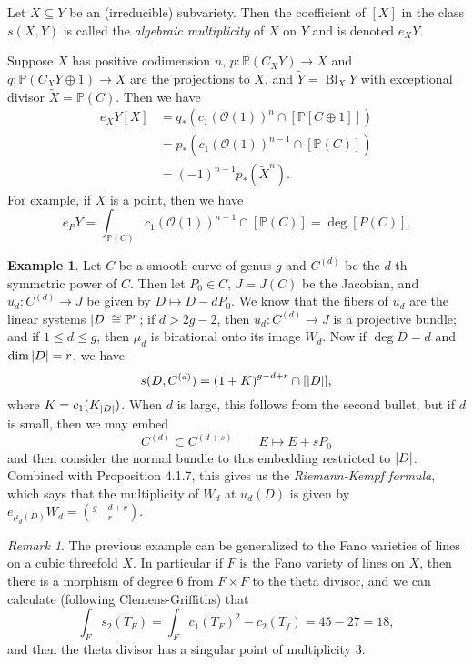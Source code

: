 \documentclass[leqno, openany]{memoir}
\theoremstyle{definition}
\newtheorem{exm}[thm]{Example}
\theoremstyle{remark}
\newtheorem{rmk}[thm]{Remark}
\theoremstyle{plain}
\theoremstyle{definition}
\theoremstyle{remark}
\renewcommand{\P}{\mathbb{P}}
\newcommand{\mc}[1]{\mathcal{#1}}
\newcommand{\wt}[1]{\widetilde{#1}}
\begin{document}
Let $X \subseteq Y$ be an (irreducible) subvariety. Then the coefficient of
$[X]$ in the class $s(X,Y)$ is called the \textit{algebraic multiplicity} of
$X$ on $Y$ and is denoted $e_X Y$. 

Suppose $X$ has positive codimension $n$, $p \colon \P(C_X Y) \to X$ and $q
\colon \P(C_X Y \oplus 1) \to X$ are the projections to $X$, and $\wt{Y} =
\operatorname{Bl}_X Y$ with exceptional divisor $\wt{X} = \P(C)$. Then we have
\begin{align*} e_X Y [X] &= q_* ( {c_1 ( \mc{O}(1) )}^n \cap [\P[C \oplus 1]] )
\\ &= p_* ({c_1 (\mc{O}(1))}^{n-1} \cap [\P(C)]) \\ &= {(-1)}^{n-1} p_*
(\wt{X}^n).  \end{align*} For example, if $X$ is a point, then we have \[ e_P Y
= \int_{\P(C)} {c_1(\mc{O}(1))}^{n-1} \cap [\P(C)] = \deg [P(C)]. \]

\begin{exm} Let $C$ be a smooth curve of genus $g$ and $C^{(d)}$ be the $d$-th
    symmetric power of $C$. Then let $P_0 \in C$, $J = J(C)$ be the Jacobian,
    and $u_d \colon C^{(d)} \to J$ be given by $D \mapsto D - d P_0$. We know
    that the fibers of $u_d$ are the linear systems $\abs{D} \cong \P^r$; if $d
    > 2g-2$, then $u_d \colon C^{(d)} \to J$ is a projective bundle; and if $1
    \leq d \leq g$, then $\mu_d$ is birational onto its image $W_d$.  Now if
    $\deg D = d$ and $\dim \abs{D} = r$, we have \[ s(D, C^{(d)}) = {(1 +
    K)}^{g-d+r} \cap [\abs{D}], \] where $K = c_1(K_{\abs{D}})$. When $d$ is
    large, this follows from the second bullet, but if $d$ is small, then we
    may embed \[ C^{(d)} \subset C^{(d+s)} \qquad E \mapsto E + s P_0 \] and
    then consider the normal bundle to this embedding restricted to $\abs{D}$.
    Combined with Proposition 4.1.7, this gives us the \textit{Riemann-Kempf
    formula}, which says that the multiplicity of $W_d$ at $u_d(D)$ is given by
    $e_{\mu_d(D)} W_d = \binom{g - d+r}{r}$.  \end{exm}

\begin{rmk} The previous example can be generalized to the Fano varieties of
    lines on a cubic threefold $X$. In particular if $F$ is the Fano variety of
    lines on $X$, then there is a morphism of degree $6$ from $F \times F$ to
    the theta divisor, and we can calculate (following Clemens-Griffiths) that
    \[ \int_F s_2(T_F) = \int_F {c_1(T_F)}^2 - c_2(T_f) = 45 - 27 = 18, \] and
then the theta divisor has a singular point of multiplicity $3$.  \end{rmk}
\end{document}
